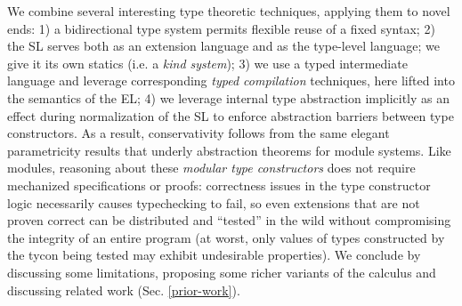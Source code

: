 \documentclass[9pt,preprint]{sigplanconf}
\begin{document}
We combine several interesting type theoretic techniques, applying them to novel ends: 1)  a bidirectional type system permits flexible reuse of a fixed syntax; 2) the SL serves both as an extension language and as the type-level language; we give it its own statics (i.e. a \emph{kind system}); 3) we use a typed intermediate language and leverage corresponding \emph{typed compilation} techniques, here lifted into the semantics of the EL; 4) we leverage internal type abstraction implicitly as an effect during normalization of the SL to enforce abstraction barriers between type constructors. 
As a result, conservativity follows from the same elegant parametricity results that underly  abstraction theorems for module systems. 
Like modules, reasoning about these \emph{modular type constructors} does not require  mechanized specifications or proofs: correctness issues in the type constructor logic necessarily causes typechecking to fail, so even extensions that are not proven correct can be distributed and ``tested'' in the wild without compromising the integrity of an entire program (at worst, only values of types constructed by the tycon being tested may exhibit undesirable properties). 
We conclude by discussing some limitations, proposing some richer variants of the calculus and discussing related work (Sec. \ref{prior-work}). %
\end{document}
